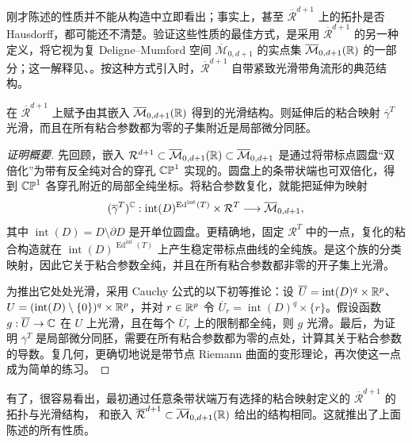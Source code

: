 刚才陈述的性质并不能从构造中立即看出；事实上，甚至 $\overline{\mathcal R}^{d+1}$ 上的拓扑是否 Hausdorff，都可能还不清楚。验证这些性质的最佳方式，是采用 $\overline{\mathcal R}^{d+1}$ 的另一种定义，将它视为复 Deligne–Mumford 空间 $\overline{\mathcal M}_{0,d+1}$ 的实点集 $\overline{\mathcal M}_{0,d+1}(\mathbb R)$ 的一部分；这一解释见、。按这种方式引入时，$\overline{\mathcal R}^{d+1}$ 自带紧致光滑带角流形的典范结构。
\begin{lemma}\label{st:9.2}
在 $\overline{\mathcal R}^{d+1}$ 上赋予由其嵌入 $\overline{\mathcal M}_{0,d+1}(\mathbb R)$ 得到的光滑结构。则延伸后的粘合映射 $\overline\gamma^T$ 光滑，而且在所有粘合参数都为零的子集附近是局部微分同胚。
\end{lemma}
\begin{proof}[证明概要]
先回顾，嵌入 $\mathcal R^{d+1}\subset\overline{\mathcal M}_{0,d+1}(\mathbb R)\subset\overline{\mathcal M}_{0,d+1}$ 是通过将带标点圆盘“双倍化”为带有反全纯对合的穿孔 $\mathbb{CP}^1$ 实现的。圆盘上的条带状端也可双倍化，得到 $\mathbb{CP}^1$ 各穿孔附近的局部全纯坐标。将粘合参数复化，就能把延伸为映射
\begin{equation}\label{eq:9.15}
(\overline\gamma^T)^{\mathbb C}:\operatorname{int}(D)^{\operatorname{Ed}^{\mathrm{int}}(T)}\times\mathcal R^T\longrightarrow\overline{\mathcal M}_{0,d+1},
\end{equation}
其中 $\operatorname{int}(D)=D\setminus\partial D$ 是开单位圆盘。更精确地，固定 $\mathcal R^T$ 中的一点，复化的粘合构造就在 $\operatorname{int}(D)^{\operatorname{Ed}^{\mathrm{int}}(T)}$ 上产生稳定带标点曲线的全纯族。是这个族的分类映射，因此它关于粘合参数全纯，并且在所有粘合参数都非零的开子集上光滑。

为推出它处处光滑，采用 Cauchy 公式的以下初等推论：设 $\overline U=\operatorname{int}(D)^q\times\mathbb R^p$、$U=(\operatorname{int}(D)\setminus\{0\})^q\times\mathbb R^p$，并对 $r\in\mathbb R^p$ 令 $\overline U_r=\operatorname{int}(D)^q\times\{r\}$。假设函数 $g:\overline U\to\mathbb C$ 在 $U$ 上光滑，且在每个 $\overline U_r$ 上的限制都全纯，则 $g$ 光滑。最后，为证明 $\overline\gamma^T$ 是局部微分同胚，需要在所有粘合参数都为零的点处，计算其关于粘合参数的导数。复几何，更确切地说是带节点 Riemann 曲面的变形理论，再次使这一点成为简单的练习。
\end{proof}
有了，很容易看出，最初通过任意条带状端万有选择的粘合映射定义的 $\overline{\mathcal R}^{d+1}$ 的拓扑与光滑结构，
和嵌入 $\overline{\mathcal R}^{d+1}\subset\overline{\mathcal M}_{0,d+1}(\mathbb R)$ 给出的结构相同。这就推出了上面陈述的所有性质。

